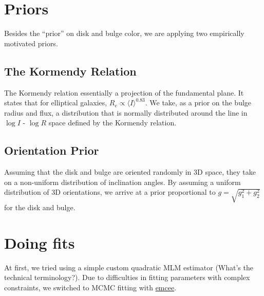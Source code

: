 \documentclass{article}
\newcommand{\comment}[1]{{\color{red} (#1)}}
\begin{document}
\section{Priors}
Besides the ``prior'' on disk and bulge color, we are applying two 
empirically motivated priors.
\subsection{The Kormendy Relation}
The Kormendy relation essentially a projection of the fundamental
plane.  It states that for elliptical galaxies, 
$R_e \propto \langle I \rangle^{0.83}$.  
We take, as a prior on the bulge radius and flux, a
distribution that is normally distributed around the line in $\log I$
- $\log R$ space defined by the Kormendy relation.

\subsection{Orientation Prior}
Assuming that the disk and bulge are oriented randomly in 3D space, 
they take on a non-uniform distribution of inclination angles.  By
assuming a uniform distribution of 3D orientations, we arrive at a
 prior proportional to $g = \sqrt{g_1^2 + g_2^2}$ for the disk and bulge.

\section{Doing fits}
At first, we tried using a simple custom quadratic MLM estimator \comment{What's the technical terminology?}.  Due to difficulties in fitting parameters with 
complex constraints, we switched to MCMC fitting with \href{http://dan.iel.fm/emcee/current/}{emcee}.
\end{document}
